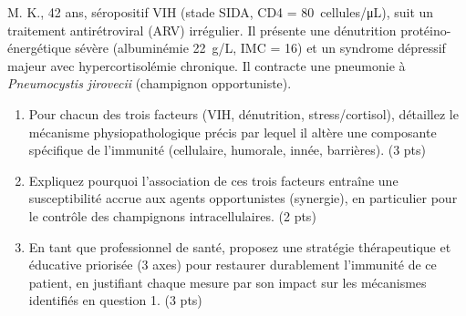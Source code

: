 \documentclass[11pt]{article}
\begin{document}
\begin{exercice}
M. K., 42 ans, séropositif VIH (stade SIDA, CD4 = \SI{80}{cellules/\micro L}), suit un traitement antirétroviral (ARV) irrégulier. Il présente une dénutrition protéino-énergétique sévère (albuminémie \SI{22}{g/L}, IMC = 16) et un syndrome dépressif majeur avec hypercortisolémie chronique. Il contracte une pneumonie à \textit{Pneumocystis jirovecii} (champignon opportuniste).

\begin{enumerate}
    \item Pour chacun des trois facteurs (VIH, dénutrition, stress/cortisol), détaillez le mécanisme physiopathologique précis par lequel il altère une composante spécifique de l'immunité (cellulaire, humorale, innée, barrières). \hfill (3 pts)
    \item Expliquez pourquoi l'association de ces trois facteurs entraîne une susceptibilité accrue aux agents opportunistes (synergie), en particulier pour le contrôle des champignons intracellulaires. \hfill (2 pts)
    \item En tant que professionnel de santé, proposez une stratégie thérapeutique et éducative priorisée (3 axes) pour restaurer durablement l'immunité de ce patient, en justifiant chaque mesure par son impact sur les mécanismes identifiés en question 1. \hfill (3 pts)
\end{enumerate}
\end{exercice}
\end{document}
